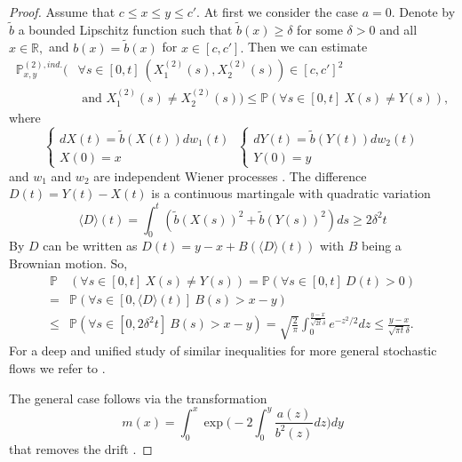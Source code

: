 \documentclass[a4paper,12pt]{article}
\newcommand{\1}{1\!\!\,{\rm I}}
\theoremstyle{plain}
\begin{document}
\begin{proof} Assume that $c\leq x\leq y\leq c'.$ At first we consider the case $a=0.$ Denote by $\tilde{b}$ a bounded Lipschitz function such that $\tilde{b}(x)\geq \delta$ for some $\delta>0$ and all $x\in\mathbb{R},$ and $b(x)=\tilde{b}(x)$ for $x\in[c,c'].$ Then we can estimate
	$$
	\begin{aligned}
	\mathbb{P}^{(2),ind.}_{x,y}(& \forall s\in[0,t] \ (X^{(2)}_1(s),X^{(2)}_2(s))\in[c,c']^2\\
	& \mbox{ and } X^{(2)}_1(s)\ne X^{(2)}_2(s)) \leq \mathbb{P}(\forall s\in[0,t] \  X(s)\ne Y(s)),	
	\end{aligned}
	$$
	where 
	$$
	\begin{cases}
	dX(t)=\tilde{b}(X(t))dw_1(t) \\
	X(0)=x
	\end{cases} \  	\begin{cases}
	dY(t)=\tilde{b}(Y(t))dw_2(t) \\
	Y(0)=y
	\end{cases} 
	$$
	and $w_1$ and $w_2$ are independent Wiener processes \cite[Ch. V, Cor. (11.10)]{RW2}. The difference $D(t)=Y(t)-X(t)$ is a continuous martingale with quadratic variation 
	$$
	\langle D\rangle(t)=\int^t_0 (\tilde{b}(X(s))^2+\tilde{b}(Y(s))^2)ds\geq 2\delta^2 t
	$$
	By \cite[Ch. V, Th. (1.6)]{RY} $D$ can be written as $D(t)=y-x+B(\langle D\rangle(t))$ with $B$ being a Brownian motion. So,
	$$
	\begin{aligned}
	\mathbb{P} &( \forall s\in[0,t] \  X(s)\ne Y(s))=\mathbb{P}(\forall s\in[0,t]\  D(t)>0) \\
	= & \mathbb{P}(\forall s\in[0,\langle D\rangle(t)]\  B(s)>x-y) \\
	\leq & \mathbb{P}(\forall s\in[0,2\delta^2 t]\  B(s)>x-y)=\sqrt{\frac{2}{\pi}}\int^{\frac{y-x}{\sqrt{2t}\delta}}_0e^{-z^2/2}dz\leq \frac{y-x}{\sqrt{\pi t}\delta}.
	\end{aligned}
	$$
	For a deep and unified study of similar inequalities for more general stochastic flows we refer to \cite{D_ent}.
	
	The general case follows via the transformation
	$$
	m(x)=\int^x_0\exp\bigg(-2\int^y_0\frac{a(z)}{b^2(z)}dz\bigg)dy
	$$
	that removes the drift \cite{Zvonkin}.
	
	
\end{proof}
\end{document}
